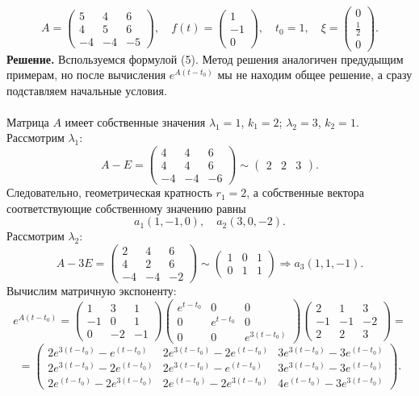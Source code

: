 \documentclass[a4paper, 12pt]{article}
\begin{document}
$$A = \begin{pmatrix}
5 & 4 & 6\\
4 & 5 & 6\\
-4 & -4 & -5
\end{pmatrix},\quad f(t)=\begin{pmatrix}
1\\-1\\0
\end{pmatrix},\quad t_0 = 1,\quad \xi = \begin{pmatrix}
0\\\frac{1}{2}\\0
\end{pmatrix}.$$
\textbf{Решение.} Вспользуемся формулой (5). Метод решения аналогичен предудыщим примерам, но после вычисления $e^{A(t-t_0)}$ мы не находим общее решение, а сразу подставляем начальные условия.\\\\
Матрица $A$ имеет собственные значения $\lambda_1 = 1$, $k_1 = 2$; $\lambda_2 = 3$, $k_2 = 1$. Рассмотрим $\lambda_1$:
$$A - E = \begin{pmatrix}
	4 & 4 & 6\\
	4 & 4 & 6\\
	-4 & -4 & -6
\end{pmatrix}\sim \begin{pmatrix}
2 & 2 & 3
\end{pmatrix}.$$
Следовательно, геометрическая кратность $r_1 = 2$, а собственные вектора соответствующие собственному значению равны $$a_1(1, -1, 0),\quad a_2(3,0,-2).$$
Рассмотрим $\lambda_2$:
$$A - 3E = \begin{pmatrix}
	2 & 4 & 6\\
	4 & 2 & 6\\
	-4 & -4 & -2
\end{pmatrix}\sim \begin{pmatrix}
1 & 0 & 1\\
0 & 1 & 1
\end{pmatrix}\Rightarrow a_3(1,1,-1).$$
Вычислим матричную экспоненту:
$$e^{A(t-t_0)} = \begin{pmatrix}
	1 & 3 & 1\\
	-1 & 0 & 1\\
	0 & -2 & -1
\end{pmatrix}\begin{pmatrix}
e^{t-t_0} & 0 & 0\\
0 & e^{t-t_0} & 0\\
0 & 0 & e^{3(t-t_0)}
\end{pmatrix}\begin{pmatrix}
2 & 1 & 3\\
-1 & -1 & -2\\
2 & 2 & 3
\end{pmatrix}=$$ $$=\begin{pmatrix}
2e^{3(t-t_0)} - e^{(t-t_0)} & 2e^{3(t-t_0)} - 2e^{(t-t_0)} & 3e^{3(t-t_0)} - 3 e^{(t-t_0)}\\
2e^{3(t-t_0)} - 2e^{(t-t_0)} & 2e^{3(t-t_0)} - e^{(t-t_0)} & 3e^{3(t-t_0)} - 3e^{(t-t_0)}\\
2e^{(t-t_0)} - 2e^{3(t-t_0)} & 2e^{(t-t_0)} - 2e^{3(t-t_0)}& 4e^{(t-t_0)} - 3e^{3(t-t_0)} 
\end{pmatrix}.$$
\end{document}
